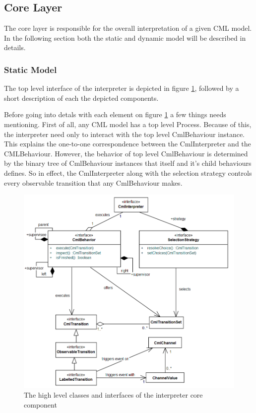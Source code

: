 \documentclass[a4paper, 10pt]{include/compassreport}   %
\begin{document}
\subsection{Core Layer}

The core layer is responsible for the overall interpretation of a
given CML model. In the following section both the static and dynamic
model will be described in details.

\subsubsection{Static Model}
\label{sec:static_structure}

The top level interface of the interpreter is depicted in figure
\ref{fig:interpreter_topLevelStructure}, followed by a short
description of each the depicted components.

Before going into detals with each element on figure
\ref{fig:interpreter_topLevelStructure} a few things needs
mentioning. First of all, any CML model has a top level
Process. Because of this, the interpreter need only to interact with
the top level CmlBehaviour instance. This explains the one-to-one
correspondence between the CmlInterpreter and the
CMLBehaviour. However, the behavior of top level CmlBehaviour is
determined by the binary tree of CmlBehaviour instances that itself
and it's child behaviours defines. So in effect, the CmlInterpreter
along with the selection strategy controls every observable transition
that any CmlBehaviour makes.

\begin{figure}[ht!]
  \begin{center}
    \includegraphics[width=1\textwidth]{figures/toplevelStructure}
    \caption{The high level classes and interfaces of the interpreter core component}
    \label{fig:interpreter_topLevelStructure}
  \end{center}
\end{figure}
\end{document}
